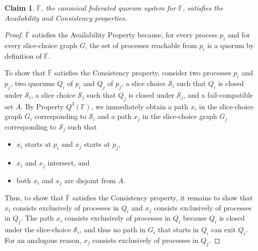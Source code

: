 \documentclass[11pt]{article}
\newtheorem{claim}{Claim}
\begin{document}
\begin{claim}
 $\overline{\mathbb{F}}$, the canonical federated quorum system for $\mathbb{F}$, satisfies the Availability and Consistency properties.
\end{claim}
\begin{proof}
  $\overline{\mathbb{F}}$ satisfies the Availability Property because, for every process $p_i$ and for every slice-choice graph $G$, the set of processes reachable from $p_i$ is a quorum by definition of $\overline{\mathbb{F}}$.


  To show that $\overline{\mathbb{F}}$ satisfies the Consistency property, consider two processes $p_i$ and $p_j$, two quorums $Q_i$ of $p_i$ and $Q_j$ of $p_j$, a slice choice $\mathcal{S}_i$ such that $Q_i$ is closed under $\mathcal{S}_i$, a slice choice $\mathcal{S}_j$ such that $Q_j$ is closed under $\mathcal{S}_j$, and a fail-compatible set $A$. By Property $Q^3(\mathbb{F})$, we immediately obtain a path $x_i$ in the slice-choice graph $G_i$ corresponding to $\mathcal{S}_i$ and a path $x_j$ in the slice-choice graph $G_j$ corresponding to $\mathcal{S}_j$ such that
    \begin{itemize}
      \item $x_i$ starts at $p_i$ and $x_j$ starts at $p_j$,
      \item $x_i$ and $x_j$ intersect, and
      \item both $x_i$ and $x_j$ are disjoint from $A$.
    \end{itemize}
    Thus, to show that $\overline{\mathbb{F}}$ satisfies the Consistency property, it remains to show that $x_i$ consists exclusively of processes in $Q_i$ and $x_j$ consists exclusively of processes in $Q_j$.
    The path $x_i$ consists exclusively of processes in $Q_i$ because $Q_i$ is closed under the slice-choice $\mathcal{S}_i$, and thus no path in $G_i$ that starts in $Q_i$ can exit $Q_i$.
    For an analogous reason, $x_j$ consists exclusively of processes in $Q_j$.
\end{proof}
\end{document}
